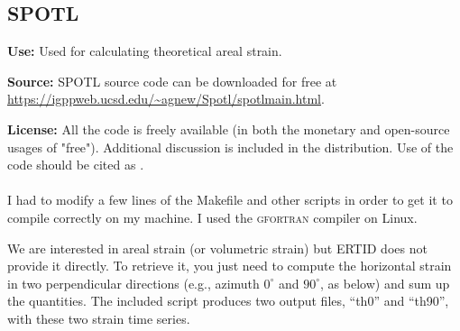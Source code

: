 \documentclass[11pt]{article}
\begin{document}
\begin{appendices}
\setcounter{secnumdepth}{1} %
\hypersetup{colorlinks=true,linkcolor=black,citecolor=black,filecolor=black,urlcolor=blue} 

\section{SPOTL}
\label{appendix:spotl}

\noindent\textbf{Use:} Used for calculating theoretical areal strain.

\noindent\textbf{Source:} \textsc{SPOTL} source code can be downloaded for free at
\url{https://igppweb.ucsd.edu/\~agnew/Spotl/spotlmain.html}.

\noindent\textbf{License:} All the code is freely available (in both the monetary and
open-source usages of "free"). Additional discussion is included in the
distribution. Use of the code should be cited as \citep{Agnew2012}.
\\ \\ 

I had to modify a few lines of the Makefile and other scripts in order to get
it to compile correctly on my machine. I used
the \textsc{gfortran} compiler on Linux.  

We are interested in areal strain (or volumetric strain) but \textsc{ERTID}
does not provide it directly. To retrieve it, you just need to compute the
horizontal strain in two perpendicular directions (e.g., azimuth $0^\circ$ and
$90^\circ$, as below) and sum up the quantities. The included script produces
two output files, “th0” and “th90”, with these two strain time series.





% 
% 
% 
% 

\end{appendices}
\end{document}
